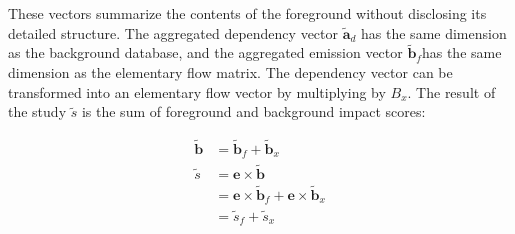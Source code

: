 These vectors summarize the contents of the foreground without disclosing its detailed structure.  The aggregated dependency vector $\tilde{\mathbf{a}}_d$ has the same dimension as the background database, and the aggregated emission vector $\tilde{\mathbf{b}}_f $has the same dimension as the elementary flow matrix.  The dependency vector can be transformed into an elementary flow vector by multiplying by $B_x$.  The result of the study $\tilde{s}$ is the sum of foreground and background impact scores:

\begin{equation}
\begin{array}{rl}
   \tilde{\mathbf{b}} & = \tilde{\mathbf{b}}_f + \tilde{\mathbf{b}}_x \\
   \tilde{s} &= \mathbf{e} \times \tilde{\mathbf{b}} \\
   & = \mathbf{e} \times \tilde{\mathbf{b}}_f + \mathbf{e} \times \tilde{\mathbf{b}}_x \\
   &= \tilde{s}_f + \tilde{s}_x
\end{array}
\label{eqn:lci}
\end{equation}
